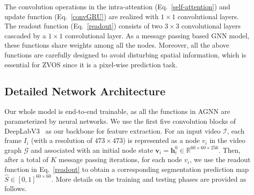 \documentclass[10pt,twocolumn,letterpaper]{article}
\begin{document}
The convolution operations in the intra-attention (Eq.~\ref{self-attention}) and update function (Eq.~\ref{convGRU}) are realized with $1\!\times\!1$ convolutional layers. The readout function (Eq.~\ref{readout}) consists of two $3\!\times\!3$ convolutional layers cascaded by a $1\!\times\!1$ convolutional layer. As a message passing based GNN model, these functions share weights among all the nodes. Moreover, all the above functions are carefully designed to avoid disturbing spatial information, which is essential for ZVOS since it is  a pixel-wise prediction task.


\subsection{Detailed Network Architecture}\label{sec:detial}
	\vspace*{-2pt}	
Our whole model is  end-to-end trainable, as all the functions in AGNN are parameterized by neural networks. We use the first five convolution blocks of DeepLabV3~\cite{DBLP:journals/corr/ChenPSA17} as our backbone for feature extraction. For an input video $\mathcal{I}$, each frame $I_i$ (with a resolution of $473\!\times\!473$) is represented as a node $v_i$ in the video graph $\mathcal{G}$ and associated with an initial node state $\textbf{v}_i\!=\! \textbf{h}^0_i\!\in\!\mathbb{R}^{60\times 60 \times 256}$. Then, after a total of $K$ message passing iterations, for each node $v_i$, we use the readout function in Eq.~\ref{readout} to obtain a corresponding segmentation prediction map $\hat{S}\!\in\![0,1]^{60\times 60}$. More details on the training and testing phases  are provided as follows.
\end{document}
